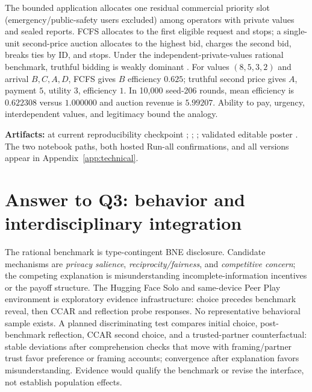 The bounded application allocates one residual commercial priority slot (emergency/public-safety users excluded) among operators with private values and sealed reports. FCFS allocates to the first eligible request and stops; a single-unit second-price auction allocates to the highest bid, charges the second bid, breaks ties by ID, and stops. Under the independent-private-values rational benchmark, truthful bidding is weakly dominant \cite{vickrey1961counterspeculation}. For values $(8,5,3,2)$ and arrival $B,C,A,D$, FCFS gives $B$ efficiency $0.625$; truthful second price gives $A$, payment $5$, utility $3$, efficiency $1$. In 10,000 seed-206 rounds, mean efficiency is $0.622308$ versus $1.000000$ and auction revenue is $5.99207$. Ability to pay, urgency, interdependent values, and legitimacy bound the analogy.

\textbf{Artifacts:} \PublicRepo{} at current reproducibility checkpoint \CurrentCommit; \ColabOne; \SpaceRepo; validated editable poster \texttt{}. The two notebook paths, both hosted Run-all confirmations, and all versions appear in Appendix~\ref{app:technical}.

\balance\small
\section{Answer to Q3: behavior and interdisciplinary integration}
The rational benchmark is type-contingent BNE disclosure. Candidate mechanisms are \emph{privacy salience}, \emph{reciprocity/fairness}, and \emph{competitive concern}; the competing explanation is misunderstanding incomplete-information incentives or the payoff structure. The Hugging Face Solo and same-device Peer Play environment is exploratory evidence infrastructure: choice precedes benchmark reveal, then CCAR and reflection probe responses. No representative behavioral sample exists. A planned discriminating test compares initial choice, post-benchmark reflection, CCAR second choice, and a trusted-partner counterfactual: stable deviations after comprehension checks that move with framing/partner trust favor preference or framing accounts; convergence after explanation favors misunderstanding. Evidence would qualify the benchmark or revise the interface, not establish population effects.

